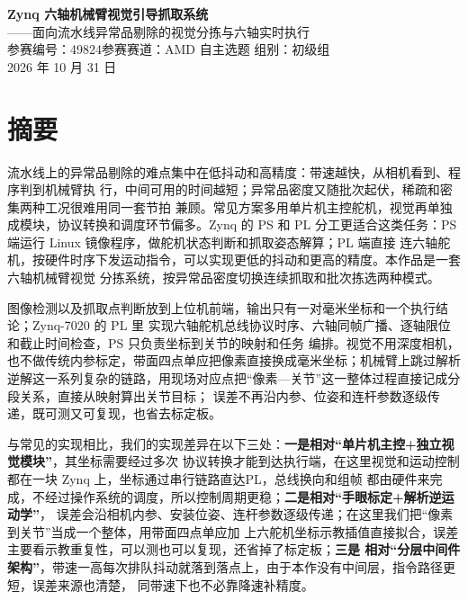 \documentclass[UTF8,a4paper,zihao=5,fontset=windows]{ctexart}
\begin{document}
\begin{center}
  {\bfseries Zynq 六轴机械臂视觉引导抓取系统}\\[5pt]
  {\large ——面向流水线异常品剔除的视觉分拣与六轴实时执行}\\[9pt]
  {\small 参赛编号：49824\quad 参赛赛道：AMD 自主选题\quad
   组别：初级组}\\[2pt]
  {\small 2026 年 10 月 31 日}
\end{center}

\vspace{-2pt}
\section*{\texorpdfstring{摘\quad 要}{摘要}}

流水线上的异常品剔除的难点集中在低抖动和高精度：带速越快，从相机看到、程序判到机械臂执
行，中间可用的时间越短；异常品密度又随批次起伏，稀疏和密集两种工况很难用同一套节拍
兼顾。常见方案多用单片机主控舵机，视觉再单独成模块，协议转换和调度环节偏多。Zynq 的
PS 和 PL 分工更适合这类任务：PS 端运行 Linux 镜像程序，做舵机状态判断和抓取姿态解算；PL 端直接
连六轴舵机，按硬件时序下发运动指令，可以实现更低的抖动和更高的精度。本作品是一套六轴机械臂视觉
分拣系统，按异常品密度切换连续抓取和批次拣选两种模式。

图像检测以及抓取点判断放到上位机前端，输出只有一对毫米坐标和一个执行结论；Zynq-7020 的 PL 里
实现六轴舵机总线协议时序、六轴同帧广播、逐轴限位和截止时间检查，PS 只负责坐标到关节的映射和任务
编排。视觉不用深度相机，也不做传统内参标定，带面四点单应把像素直接换成毫米坐标；机械臂上跳过解析
逆解这一系列复杂的链路，用现场对应点把“像素—关节”这一整体过程直接记成分段关系，直接从映射算出关节目标；
误差不再沿内参、位姿和连杆参数逐级传递，既可测又可复现，也省去标定板。

与常见的实现相比，我们的实现差异在以下三处：\textbf{一是相对“单片机主控+独立视觉模块”}，其坐标需要经过多次
协议转换才能到达执行端，在这里视觉和运动控制都在一块 Zynq 上，坐标通过串行链路直达PL，总线换向和组帧
都由硬件来完成，不经过操作系统的调度，所以控制周期更稳；\textbf{二是相对“手眼标定+解析逆运动学”}，
误差会沿相机内参、安装位姿、连杆参数逐级传递；在这里我们把“像素到关节”当成一个整体，用带面四点单应加
上六舵机坐标示教插值直接拟合，误差主要看示教重复性，可以测也可以复现，还省掉了标定板；\textbf{三是
相对“分层中间件架构”}，带速一高每次排队抖动就落到落点上，由于本作没有中间层，指令路径更短，误差来源也清楚，
同带速下也不必靠降速补精度。
\end{document}
